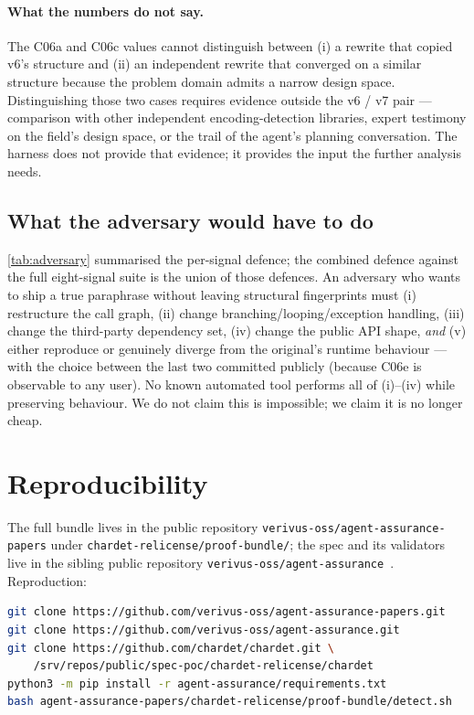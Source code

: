 \documentclass[11pt,letterpaper]{article}
\begin{document}
\paragraph{What the numbers do not say.} The C06a and C06c values
cannot distinguish between (i) a rewrite that copied v6's structure
and (ii) an independent rewrite that converged on a similar
structure because the problem domain admits a narrow design space.
Distinguishing those two cases requires evidence outside the v6 /
v7 pair --- comparison with other independent encoding-detection
libraries, expert testimony on the field's design space, or the
trail of the agent's planning conversation. The harness does not
provide that evidence; it provides the input the further analysis
needs.

\subsection{What the adversary would have to do}
\label{sec:adversary}
\cref{tab:adversary} summarised the per-signal defence; the
combined defence against the full eight-signal suite is the union of
those defences. An adversary who wants to ship a true paraphrase
without leaving structural fingerprints must (i) restructure the
call graph, (ii) change branching/looping/exception handling, (iii)
change the third-party dependency set, (iv) change the public API
shape, \emph{and} (v) either reproduce or genuinely diverge from the
original's runtime behaviour --- with the choice between the last
two committed publicly (because C06e is observable to any user). No
known automated tool performs all of (i)--(iv) while preserving
behaviour. We do not claim this is impossible; we claim it is no
longer cheap.

\section{Reproducibility}
\label{sec:repro}

The full bundle lives in the public repository
\texttt{verivus-oss/agent-assurance-papers} under
\texttt{chardet-relicense/proof-bundle/}; the spec and its validators
live in the sibling public repository
\texttt{verivus-oss/agent-assurance}~\cite{verivus2026dagtoml}.
Reproduction:

\begin{lstlisting}[language=bash,caption={End-to-end reproduction.}]
git clone https://github.com/verivus-oss/agent-assurance-papers.git
git clone https://github.com/verivus-oss/agent-assurance.git
git clone https://github.com/chardet/chardet.git \
    /srv/repos/public/spec-poc/chardet-relicense/chardet
python3 -m pip install -r agent-assurance/requirements.txt
bash agent-assurance-papers/chardet-relicense/proof-bundle/detect.sh
\end{lstlisting}
\end{document}
